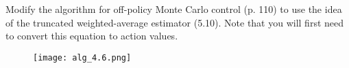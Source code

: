 
\begin{exercise}[Exercise 5.14]

Modify the algorithm for off-policy Monte Carlo control (p. 110)
to use the idea of the truncated weighted-average estimator (5.10).
Note that you will first need to convert this equation to action values.

\begin{figure}[H]
    \centering
    \texttt{[image: alg\_4.6.png]}
\end{figure}

\end{exercise}


